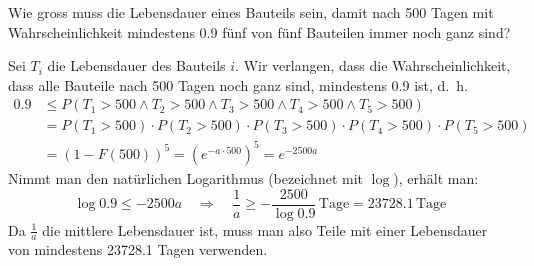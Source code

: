 Wie gross muss die Lebensdauer eines Bauteils sein, damit nach 500
Tagen mit Wahrscheinlichkeit mindestens 0.9 fünf von fünf Bauteilen
immer noch ganz sind?

\begin{loesung}
Sei $T_i$ die Lebensdauer des Bauteils $i$. Wir verlangen, dass
die Wahrscheinlichkeit, dass alle Bauteile nach 500 Tagen noch
ganz sind, mindestens 0.9 ist, d.~h.
\begin{align*}
0.9
&\le
P(
T_1 > 500
\wedge
T_2 > 500
\wedge
T_3 > 500
\wedge
T_4 > 500
\wedge
T_5 > 500)
\\
&=
P(T_1 > 500)
\cdot
P(T_2 > 500)
\cdot
P(T_3 > 500)
\cdot
P(T_4 > 500)
\cdot
P(T_5 > 500)
\\
&=(1-F(500))^5=(e^{-a\cdot 500})^5=e^{-2500a}
\end{align*}
Nimmt man den natürlichen Logarithmus (bezeichnet mit $\log$),
erhält man:
\[
\log 0.9\le -2500 a\quad\Rightarrow\quad \frac1a \ge -\frac{2500}{\log 0.9}
\,\text{Tage}
=23728.1
\,
\text{Tage}
\]
Da $\frac1a$ die mittlere Lebensdauer ist, muss man also Teile mit
einer Lebensdauer von mindestens 23728.1 Tagen verwenden.
\end{loesung}

